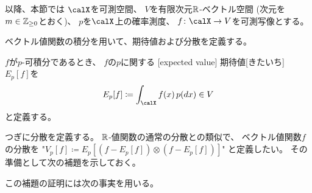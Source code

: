 \documentclass[report]{jlreq}
\begin{document}
以降、本節では
$\calX$を可測空間、
$V$を有限次元$\mathbb{R}$-ベクトル空間 (次元を$m \in \mathbb{Z}_{\ge 0}$とおく)、
$p$を$\calX$上の確率測度、
$f \colon \calX \to V$を可測写像とする。

ベクトル値関数の積分を用いて、期待値および分散を定義する。

\begin{definition}[期待値]
    $f$が$p$-可積分であるとき、
    $f$の$p$に関する
    [expected value]
        {期待値}[きたいち]
    $E_p[f]$を
    \begin{equation}
        E_p[f] \coloneqq \int_\calX f(x) \, p(dx)
            \in V
    \end{equation}
    と定義する。
\end{definition}

つぎに分散を定義する。
$\mathbb{R}$-値関数の通常の分散との類似で、
ベクトル値関数$f$の分散を
"$V_p[f] \coloneqq E_p[(f - E_p[f]) \otimes (f - E_p[f])]$"
と定義したい。
その準備として次の補題を示しておく。


この補題の証明には次の事実を用いる。

\end{document}
